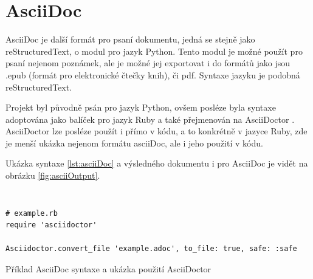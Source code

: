 \clearpage

\section{AsciiDoc}

AsciiDoc je další formát pro psaní dokumentu, jedná se stejně jako reStructuredText, o modul pro jazyk Python. Tento modul je možné použít pro psaní nejenom poznámek,
ale je možné jej exportovat i do formátů jako jsou .epub (formát pro elektronické čtečky knih), či \gls{pdf}. \cite{asciiDoc} Syntaxe jazyku je podobná reStructuredText.

Projekt byl původně psán pro jazyk Python, ovšem posléze byla syntaxe adoptována jako balíček pro jazyk Ruby a také přejmenován na AsciiDoctor \cite{asciiDoctorSW}. AsciiDoctor lze posléze
použít i přímo v kódu, a to konkrétně v jazyce Ruby, zde je menší ukázka nejenom formátu asciiDoc, ale i jeho použití v kódu.

Ukázka syntaxe \ref{lst:asciiDoc} a výsledného dokumentu i pro AsciiDoc je vidět na obrázku \ref{fig:asciiOutput}.

\begin{listing}[ht]
    \inputminted[linenos,breaklines]{text}{example-ascii.adoc}
    \inputminted[linenos,breaklines]{text}{module.adoc}
    \begin{verbatim}
# example.rb
require 'asciidoctor'

Asciidoctor.convert_file 'example.adoc', to_file: true, safe: :safe
    \end{verbatim}
    \caption{Příklad AsciiDoc syntaxe a ukázka použití AsciiDoctor}
    \label{lst:asciiDoc}
\end{listing}


